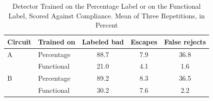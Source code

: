 \begin{table}[!t]
\caption{Detector Trained on the Percentage Label or on the Functional Label, Scored Against
Compliance. Mean of Three Repetitions, in Percent}
\label{tab:severity}
\centering
\begin{tabular}{@{}llccc@{}}
\toprule
Circuit & Trained on & Labeled bad & Escapes & False rejects \\
\midrule
A & Percentage & 88.7 & 7.9 & 36.8 \\
 & Functional & 21.0 & 4.1 & 1.6 \\
B & Percentage & 89.2 & 8.3 & 36.5 \\
 & Functional & 30.2 & 7.6 & 2.2 \\
\bottomrule
\end{tabular}
\end{table}
